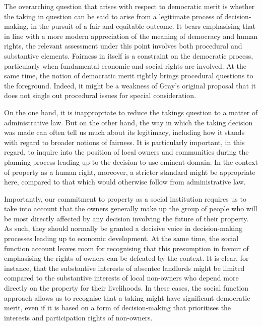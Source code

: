 
The overarching question that arises with respect to democratic merit is whether the taking in question 
can be said to arise from a legitimate process of decision-making, in the pursuit of a fair and equitable outcome. It bears emphasising that in line with a more modern appreciation of the meaning of democracy and human rights, the relevant assessment under this point involves both procedural and substantive elements. Fairness in itself is a constraint on the democratic process, particularly when fundamental economic and social rights are involved. At the same time, the notion of democratic merit rightly brings procedural questions to the foreground. Indeed, it might be a weakness of Gray's original proposal that it does not single out procedural issues for special consideration.

On the one hand, it is inappropriate to reduce the takings question to a matter of administrative law. But on the other hand, the way in which the taking decision was made can often tell us much about its legitimacy, including how it stands with regard to broader notions of fairness. It is particularly important, in this regard, to inquire into the position of local owners and communities during the planning process leading up to the decision to use eminent domain. In the context of property as a human right, moreover, a stricter standard might be appropriate here, compared to that which would otherwise follow from administrative law.

Importantly, our commitment to property as a social institution requires us to take into account that the owners generally make up the group of people who will be most directly affected by any decision involving the future of their property. As such, they should normally be granted a decisive voice in decision-making processes leading up to economic development. At the same time, the social function account leaves room for recognising that this presumption in favour of emphasising the rights of owners can be defeated by the context. It is clear, for instance, that the substantive interests of absentee landlords might be limited compared to the substantive interests of local non-owners who depend more directly on the property for their livelihoods. In these cases, the social function approach allows us to recognise that a taking might have significant democratic merit, even if it is based on a form of decision-making that prioritises the interests and participation rights of non-owners.


